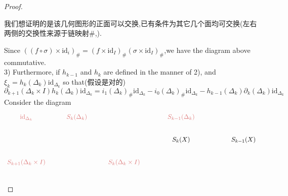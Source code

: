 \documentclass{article}
\begin{document}
\begin{proof}
\begin{remark}
\begin{figure}[h]
        \end{figure}
        我们想证明的是该几何图形的正面可以交换,已有条件为其它几个面均可交换(左右两侧的交换性来源于链映射$\#$,).
    \end{remark}
    Since $((f\circ \sigma)\times \text{id}_i)_\#  = (f \times \text{id}_I)_\#(\sigma \times \text{id}_I)_\#$,we have the diagram above commutative.\\
    3) Furthermore, if $h_{k-1}$ and $h_k$ are defined in the manner of 2), and $\xi_k = h_k(\Delta_k) \text{id}_{\Delta_k}$ so that(假设是对的)
    \begin{equation}
        \partial_{k+1}(\Delta_k \times I)h_k(\Delta_k)\text{id}_{\Delta_k} = i_1(\Delta_k)_\#\text{id}_{\Delta_k} - i_0(\Delta_k)_\# \text{id}_{\Delta_k}- h_{k-1}(\Delta_k)\partial_{k}(\Delta_k)\text{id}_{\Delta_k}
        \tag{$*$}
        \label{*}
    \end{equation}
   Consider the diagram
    \[\begin{tikzcd}
        \textcolor{rgb,255:red,221;green,120;blue,120}{\text{id}_{\Delta_k}} & \textcolor{rgb,255:red,221;green,120;blue,120}{S_k(\Delta_k)} && \textcolor{rgb,255:red,221;green,120;blue,120}{S_{k-1}(\Delta_k)} \\
        &&& {S_k(X)} && {S_{k-1}(X)} \\
        \textcolor{rgb,255:red,221;green,120;blue,120}{S_{k+1}(\Delta_{k} \times I)} && \textcolor{rgb,255:red,221;green,120;blue,120}{S_k(\Delta_k \times I)\quad} \\

\end{tikzcd}\]
\end{proof}
\end{document}
